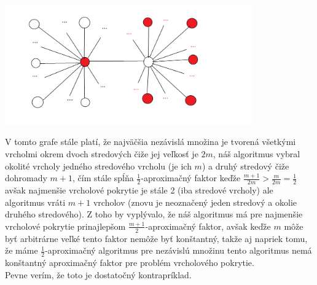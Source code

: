 \documentclass[a4paper]{article}
\begin{document}
\centerline{\includegraphics[width=0.8\textwidth]{2n2}}

V tomto grafe stále platí, že najväčšia nezávislá množina je tvorená všetkými vrcholmi okrem dvoch stredových čiže jej veľkosť je $2m$, náš algoritmus vybral okolité vrcholy jedného stredového vrcholu (je ich $m$) a druhý stredový čiže dohromady $m+1$, čím stále spĺňa $\frac{1}{2}$-aproximačný faktor keďže $\frac{m+1}{2m} > \frac{m}{2m} = \frac{1}{2}$ avšak najmenšie vrcholové pokrytie je stále 2 (iba stredové vrcholy) ale algoritmus vráti $m+1$ vrcholov (znovu je neoznačený jeden stredový a okolie druhého stredového). Z toho by vyplývalo, že náš algoritmus má pre najmenšie vrcholové pokrytie prinajlepšom $\frac{m+1}{2}$-aproximačný faktor, avšak keďže $m$ môže byť arbitrárne veľké tento faktor nemôže byť konštantný, takže aj napriek tomu, že máme $\frac{1}{2}$-aproximačný algoritmus pre nezávislú množinu tento algoritmus nemá konštantný aproximačný faktor pre problém vrcholového pokrytie.
\\

Pevne verím, že toto je dostatočný kontrapríklad.
\end{document}
